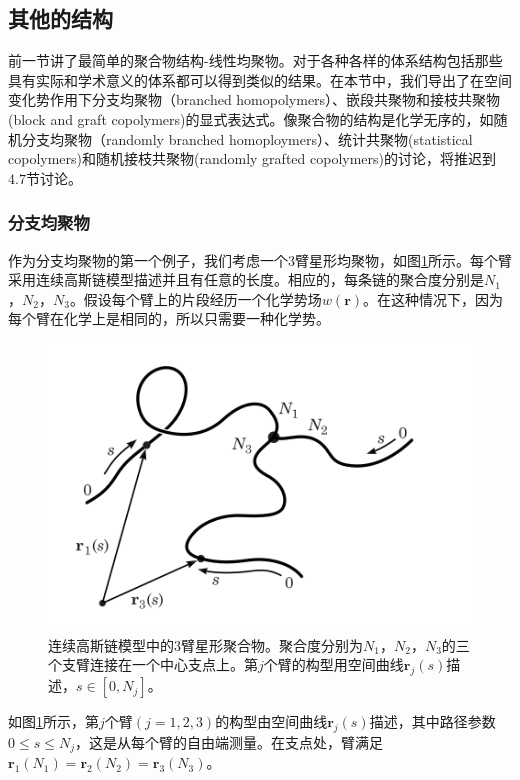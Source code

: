 \subsection{其他的结构}
前一节讲了最简单的聚合物结构-线性均聚物。对于各种各样的体系结构包括那些具有实际和学术意义的体系都可以得到类似的结果。在本节中，我们导出了在空间变化势作用下分支均聚物（branched homopolymers）、嵌段共聚物和接枝共聚物(block and graft copolymers)的显式表达式。像聚合物的结构是化学无序的，如随机分支均聚物（randomly branched homoploymers）、统计共聚物(statistical copolymers)和随机接枝共聚物(randomly grafted copolymers)的讨论，将推迟到$4.7$节讨论。
\subsubsection{分支均聚物}
作为分支均聚物的第一个例子，我们考虑一个$3$臂星形均聚物，如图\ref{三臂星形均聚物}所示。每个臂采用连续高斯链模型描述并且有任意的长度。相应的，每条链的聚合度分别是$N_1$，$N_2$，$N_3$。假设每个臂上的片段经历一个化学势场$w (\mathbf{r})$。在这种情况下，因为每个臂在化学上是相同的，所以只需要一种化学势。
\begin{figure}[H]
\centering
\includegraphics[scale=0.7]{./figures/34.png}
\caption{连续高斯链模型中的$3$臂星形聚合物。聚合度分别为$N_1$，$N_2$，$N_3$的三个支臂连接在一个中心支点上。第$j$个臂的构型用空间曲线$\mathbf{r}_j(s)$描述，$s\in [0,N_j]$。}
\label{三臂星形均聚物}
\end{figure}

如图\ref{三臂星形均聚物}所示，第$j$个臂$(j=1,2,3)$的构型由空间曲线$\mathbf{r}_j(s)$描述，其中路径参数$0\leq s\leq N_j$，这是从每个臂的自由端测量。在支点处，臂满足$\mathbf{r}_1(N_1)=\mathbf{r}_2(N_2)=\mathbf{r}_3(N_3)$。

